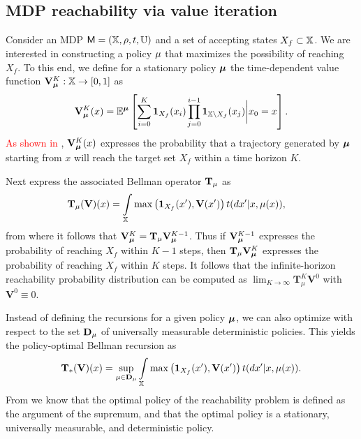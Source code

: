 \documentclass{ifacconf}
\newcommand{\ind}{\mathbf{1}}
\begin{document}
\subsection{MDP reachability via value iteration}

Consider an MDP $\mathsf{M} = ({\mathbb{X}}, \rho, t, {\mathbb{U}})$ and a set of accepting states $X_f \subset {\mathbb{X}}$. We are interested in constructing a policy ${\mu}$ that maximizes the possibility of reaching $X_f$. To this end, we define for a stationary policy ${\boldsymbol{\mu}}$ the time-dependent value function $\mathbf V_{\boldsymbol{\mu}}^K:{\mathbb{X}}\rightarrow [0,1]$ as 
\begin{equation*}
\label{eq:Valfunc}
  \mathbf V^K_\polb(x)=\mathbb{E}^\polb \left[ \sum\limits_{ i=0 }^K \ind_{X_f}( x_i) \prod \limits_{\mathclap{j = 0}}^{i-1}\ind_{ \X \setminus X_f}( x_j ) \bigg| x_0 = x \right].
\end{equation*}
\textcolor{red}{As shown in \citep{Abate1}}, $\mathbf V_{\boldsymbol{\mu}}^K (x)$ expresses the probability that a trajectory generated by ${\boldsymbol{\mu}}$ starting from $x$ will reach the target set $X_f$ within a time horizon $K$.

Next express the associated Bellman operator ${\mathbf {T}}_{\mu}$ as
\begin{align}
\label{eq:V_recopt}
  & \Bel_\pol (\mathbf  V)(x) = \int_\X \max \left( \mathbf 1_{X_f}( x'), \mathbf V(x') \right) {\tr}(d  x' | x,\pol( x)),
\end{align}
from where it follows that $\mathbf V_{\boldsymbol{\mu}}^{K} = {\mathbf {T}}_{\mu} \mathbf V_{\boldsymbol{\mu}}^{K-1}$. Thus if $\mathbf V_{\boldsymbol{\mu}}^{K-1} $ expresses the probability of reaching $X_f$ within $K-1$ steps, then $ {\mathbf {T}}_{\mu} \mathbf V_{\boldsymbol{\mu}}^{K} $ expresses the probability of reaching $X_f$ within $K$ steps. It follows that the infinite-horizon reachability probability distribution can be computed as $\lim_{K\rightarrow \infty}\mathbf T_\mu^{K} \mathbf V^0$ with $\mathbf{V}^0 \equiv 0$.

Instead of defining the recursions for a given policy ${\boldsymbol{\mu}}$, we can also optimize with respect to the set $\mathbf D_{{\mu}}$ of universally measurable deterministic policies. This yields the policy-optimal Bellman recursion as
\begin{equation*}
  \Bel_\ast (\mathbf V)(x) =\sup_{\pol \in \mathbf D_{\pol}} \int_{\X} \max \left( \mathbf 1_{X_f}( x'), \mathbf V(x') \right) {\tr}(d  x' | x,\pol( x)).
\end{equation*}
From \cite{Abate1} we know that the optimal policy of the reachability problem is defined as the argument of the supremum, and that the optimal policy is a stationary, universally measurable, and deterministic policy.
\end{document}
